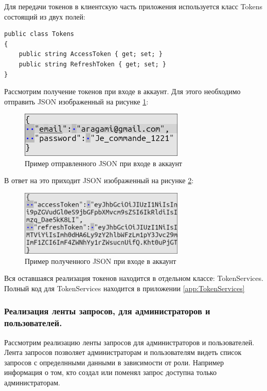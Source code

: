Для передачи токенов в клиентскую часть приложения используется класс Tokens состоящий из двух полей:

\begin{verbatim}
public class Tokens
{
    public string AccessToken { get; set; }
    public string RefreshToken { get; set; }
}
\end{verbatim}

Рассмотрим получение токенов при входе в аккаунт. Для этого необходимо отправить JSON изображенный на рисунке \ref{fig:LoginInput}:

\begin{figure}[!h]
    \centering
    \includegraphics[width = 0.7\textwidth]{imgs/LoginInput.png}
    \caption{Пример отправленного JSON при входе в аккаунт}
    \label{fig:LoginInput}
\end{figure}

В ответ на это приходит JSON изображенный на рисунке \ref{fig:LoginOutput}:

\newpage
\begin{figure}[!h]
    \centering
    \includegraphics[width = 0.7\textwidth]{imgs/LoginOutput.png}
    \caption{Пример полученного JSON при входе в аккаунт}
    \label{fig:LoginOutput}
\end{figure}

Вся оставшаяся реализация токенов находится в отдельном классе: TokenServices. Полный код для TokenServices находится в приложении \ref{app:TokenServices}

\subsubsection{Реализация ленты запросов, для администраторов и пользователей.}

Рассмотрим реализацию ленты запросов для администраторов и пользователей. Лента запросов позволяет администраторам и пользователям видеть список запросов с определнными данными в зависимости от роли. Например информация о том, кто создал или поменял запрос доступна только администраторам.

